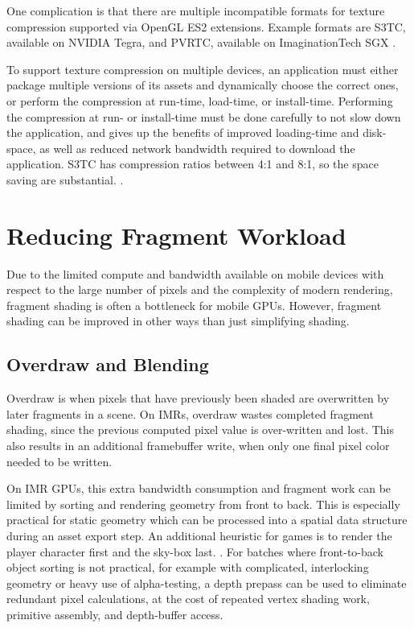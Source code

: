 One complication is that there are multiple incompatible formats for texture
compression supported via OpenGL ES2 extensions.  Example formats are S3TC,
available on NVIDIA Tegra, and PVRTC, available on ImaginationTech SGX
\cite{Motorola11}.

To support texture compression on multiple devices, an application must either
package multiple versions of its assets and dynamically choose the correct
ones, or perform the compression at run-time, load-time, or install-time.
Performing the compression at run- or install-time must be done carefully to
not slow down the application, and gives up the benefits of improved
loading-time and disk-space, as well as reduced network bandwidth required to
download the application.  S3TC has compression ratios between 4:1 and 8:1, so the space saving are substantial.
\cite{Domine00}.

\section{Reducing Fragment Workload}
\label{Jon-McCaffrey-Reducing-Fragment-Workload}


Due to the limited compute and bandwidth available on mobile devices with
respect to the large number of pixels and the complexity of modern rendering,
fragment shading is often a bottleneck for mobile GPUs.  However, fragment
shading can be improved in other ways than just simplifying shading.

\subsection{Overdraw and Blending}\label{Jon-McCaffrey-Overdraw-And-Blending}
Overdraw is when pixels that have previously been shaded are overwritten by
later fragments in a scene.  On IMRs, overdraw wastes completed fragment shading,
since the previous computed pixel value is over-written and lost.  This also results in an additional framebuffer write, when only one final pixel color needed to be written.

On IMR GPUs, this extra bandwidth consumption and fragment work can be limited
by sorting and rendering geometry from front to back.  This is especially
practical for static geometry which can be processed into a spatial data
structure during an asset export step.  An additional heuristic for games is to
render the player character first and the sky-box last.
\cite{Pranckevicius11a}.  For batches where front-to-back object sorting is not
practical, for example with complicated, interlocking geometry or heavy use of
alpha-testing, a depth prepass can be used to eliminate redundant pixel
calculations, at the cost of repeated vertex shading work, primitive assembly,
and depth-buffer access.

